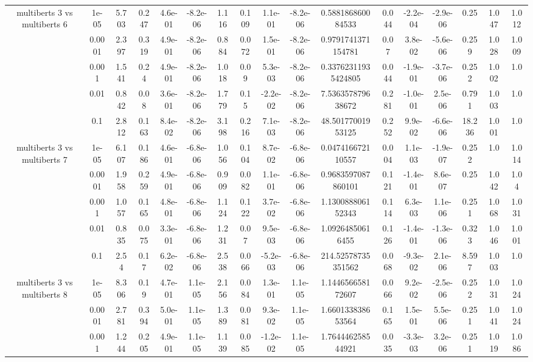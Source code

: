 \begin{tabular}{|c|c|c|c|c|c|c|c|c|c|c|c|c|c|c|c|c|}
\hline
\multirow{5}{*}{multiberts 3 vs multiberts 6} & 1e-05 & 5.703 & 0.247 & 4.6e-01 & -8.2e-06 & 1.116 & 0.109 & 1.1e-01 & -8.2e-06 & 0.588186860084533 & 0.044 & -2.2e-04 & -2.9e-06 & 0.25 & 1.047 & 1.012 \\
 & 0.0001 & 2.397 & 0.319 & 4.9e-01 & -8.2e-06 & 0.884 & 0.072 & 1.5e-01 & -8.2e-06 & 0.9791741371154781 & 0.07 & 3.8e-02 & -5.6e-06 & 0.259 & 1.028 & 1.009 \\
 & 0.001 & 1.541 & 0.24 & 4.9e-01 & -8.2e-06 & 1.018 & 0.09 & 5.3e-03 & -8.2e-06 & 0.33762311935424805 & 0.044 & -1.9e-01 & -3.7e-06 & 0.252 & 1.002 & 1.0 \\
 & 0.01 & 0.842 & 0.08 & 3.6e-01 & -8.2e-06 & 1.779 & 0.15 & -2.2e-02 & -8.2e-06 & 7.536357879638672 & 0.281 & -1.0e-01 & 2.5e-06 & 0.791 & 1.003 & 1.0 \\
 & 0.1 & 2.812 & 0.163 & 8.4e-02 & -8.2e-06 & 3.198 & 0.216 & 7.1e-03 & -8.2e-06 & 48.50177001953125 & 0.252 & 9.9e-02 & -6.6e-06 & 18.236 & 1.001 & 1.0 \\
\hline
\multirow{5}{*}{multiberts 3 vs multiberts 7} & 1e-05 & 6.107 & 0.186 & 4.6e-01 & -6.8e-06 & 1.056 & 0.104 & 8.7e-02 & -6.8e-06 & 0.047416672110557 & 0.004 & 1.1e-03 & -1.9e-07 & 0.252 & 1.0 & 1.014 \\
 & 0.0001 & 1.958 & 0.259 & 4.9e-01 & -6.8e-06 & 0.909 & 0.082 & 1.1e-01 & -6.8e-06 & 0.9683597087860101 & 0.121 & -1.4e-01 & 8.6e-07 & 0.25 & 1.042 & 1.04 \\
 & 0.001 & 1.057 & 0.165 & 4.8e-01 & -6.8e-06 & 1.124 & 0.122 & 3.7e-02 & -6.8e-06 & 1.130088806152343 & 0.114 & 6.3e-03 & 1.1e-06 & 0.251 & 1.068 & 1.031 \\
 & 0.01 & 0.835 & 0.075 & 3.3e-01 & -6.8e-06 & 1.231 & 0.07 & 9.5e-03 & -6.8e-06 & 1.09264850616455 & 0.126 & -1.4e-01 & -1.3e-06 & 0.323 & 1.046 & 1.001 \\
 & 0.1 & 2.54 & 0.17 & 6.2e-02 & -6.8e-06 & 2.538 & 0.066 & -5.2e-03 & -6.8e-06 & 214.52578735351562 & 0.068 & -9.3e-02 & 2.1e-06 & 8.597 & 1.003 & 1.0 \\
\hline
\multirow{5}{*}{multiberts 3 vs multiberts 8} & 1e-05 & 8.306 & 0.19 & 4.7e-01 & 1.1e-05 & 2.156 & 0.084 & 1.3e-01 & 1.1e-05 & 1.144656658172607 & 0.066 & 9.2e-02 & -2.5e-06 & 0.252 & 1.031 & 1.024 \\
 & 0.0001 & 2.781 & 0.394 & 5.0e-01 & 1.1e-05 & 1.389 & 0.081 & 9.3e-02 & 1.1e-05 & 1.660133838653564 & 0.165 & 1.5e-01 & 5.5e-06 & 0.251 & 1.041 & 1.024 \\
 & 0.001 & 1.244 & 0.205 & 4.9e-01 & 1.1e-05 & 1.139 & 0.085 & -1.2e-02 & 1.1e-05 & 1.764446258544921 & 0.035 & -3.3e-03 & 3.2e-06 & 0.251 & 1.019 & 1.086 \\

\end{tabular}
